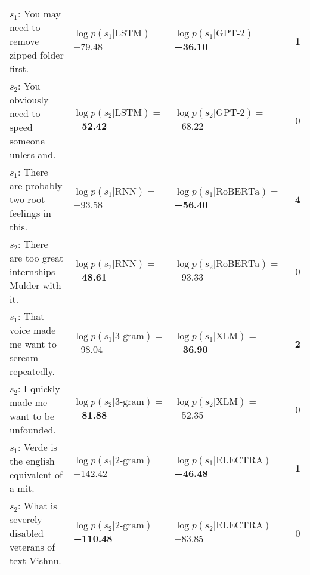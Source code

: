 \begin{tabularx}{\textwidth}{lllc}
             $s_1$: You may need to remove zipped folder first. &              $\log p(s_1 | \textrm{LSTM})=$\num{-79.48} &    $\log p(s_1 | \textrm{GPT-2})=$\textbf{\num{-36.10}} &  \textbf{\num{1}} \\
         $s_2$: You obviously need to speed someone unless and. &     $\log p(s_2 | \textrm{LSTM})=$\textbf{\num{-52.42}} &             $\log p(s_2 | \textrm{GPT-2})=$\num{-68.22} &           \num{0} \\\midrule
           $s_1$: There are probably two root feelings in this. &               $\log p(s_1 | \textrm{RNN})=$\num{-93.58} &  $\log p(s_1 | \textrm{RoBERTa})=$\textbf{\num{-56.40}} &  \textbf{\num{4}} \\
         $s_2$: There are too great internships Mulder with it. &      $\log p(s_2 | \textrm{RNN})=$\textbf{\num{-48.61}} &           $\log p(s_2 | \textrm{RoBERTa})=$\num{-93.33} &           \num{0} \\\midrule
           $s_1$: That voice made me want to scream repeatedly. &            $\log p(s_1 | \textrm{3-gram})=$\num{-98.04} &      $\log p(s_1 | \textrm{XLM})=$\textbf{\num{-36.90}} &  \textbf{\num{2}} \\
                 $s_2$: I quickly made me want to be unfounded. &   $\log p(s_2 | \textrm{3-gram})=$\textbf{\num{-81.88}} &               $\log p(s_2 | \textrm{XLM})=$\num{-52.35} &           \num{0} \\\midrule
               $s_1$: Verde is the english equivalent of a mit. &           $\log p(s_1 | \textrm{2-gram})=$\num{-142.42} &  $\log p(s_1 | \textrm{ELECTRA})=$\textbf{\num{-46.48}} &  \textbf{\num{1}} \\
      $s_2$: What is severely disabled veterans of text Vishnu. &  $\log p(s_2 | \textrm{2-gram})=$\textbf{\num{-110.48}} &           $\log p(s_2 | \textrm{ELECTRA})=$\num{-83.85} &           \num{0} \\
\bottomrule
\end{tabularx}
